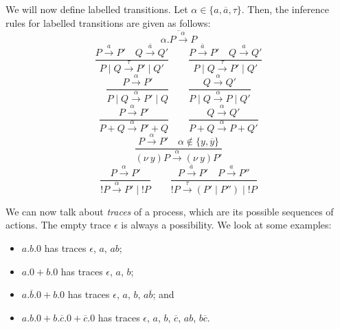 \documentclass[a4paper, openany]{memoir}
\theoremstyle{definition}
\begin{document}
    We will now define labelled transitions. Let $\alpha \in \{a, \overline{a}, \tau\}$. Then, the inference rules for labelled transitions are given as follows:
    \[\overline{\alpha.P \xrightarrow{\alpha} P}\]
    \[\frac{P \xrightarrow{a} P' \quad Q \xrightarrow{\overline{a}} Q'}{P \mid Q \xrightarrow{\tau} P' \mid Q'} \qquad \frac{P \xrightarrow{\overline{a}} P' \quad Q \xrightarrow{a} Q'}{P \mid Q \xrightarrow{\tau} P' \mid Q'}\]
    \[\frac{P \xrightarrow{\alpha} P'}{P \mid Q \xrightarrow{\alpha} P' \mid Q} \qquad \frac{Q \xrightarrow{\alpha} Q'}{P \mid Q \xrightarrow{\alpha} P \mid Q'}\]
    \[\frac{P \xrightarrow{\alpha} P'}{P + Q \xrightarrow{\alpha} P' + Q} \qquad \frac{Q \xrightarrow{\alpha} Q'}{P + Q \xrightarrow{\alpha} P + Q'}\]
    \[\frac{P \xrightarrow{\alpha} P' \quad \alpha \not\in \{y, \overline{y}\}}{(\nu \ y)P \xrightarrow{\alpha} (\nu \ y)P'}\]
    \[\frac{P \xrightarrow{\alpha} P'}{!P \xrightarrow{\alpha} P' \mid !P} \qquad \frac{P \xrightarrow{\overline{a}} P' \quad P \xrightarrow{a} P''}{!P \xrightarrow{\tau} (P' \mid P'') \mid !P}\]

    We can now talk about \emph{traces} of a process, which are its possible sequences of actions. The empty trace $\epsilon$ is always a possibility. We look at some examples:
    \begin{itemize}
        \item $a.b.0$ has traces $\epsilon$, $a$, $ab$;
        \item $a.0 + b.0$ has traces $\epsilon$, $a$, $b$;
        \item $a.\overline{b}.0 + b.0$ has traces $\epsilon$, $a$, $b$, $a\overline{b}$; and
        \item $a.b.0 + b.\overline{c}.0 + \overline{c}.0$ has traces $\epsilon$, $a$, $b$, $\overline{c}$, $ab$, $b\overline{c}$.
    \end{itemize}
\end{document}
